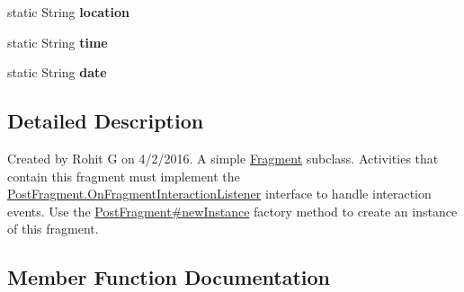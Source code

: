 \begin{DoxyCompactItemize}
\begin{DoxyCompactItemize}
\item 
\hypertarget{classcom_1_1example_1_1sel_1_1lostfound_1_1PostFragment_aa71417aabbbacf85c296b9cbb189a05f}{static \-String {\bfseries location}}\label{classcom_1_1example_1_1sel_1_1lostfound_1_1PostFragment_aa71417aabbbacf85c296b9cbb189a05f}

\item 
\hypertarget{classcom_1_1example_1_1sel_1_1lostfound_1_1PostFragment_a74d19376fb2db9228d8379e1cfcd6722}{static \-String {\bfseries time}}\label{classcom_1_1example_1_1sel_1_1lostfound_1_1PostFragment_a74d19376fb2db9228d8379e1cfcd6722}

\item 
\hypertarget{classcom_1_1example_1_1sel_1_1lostfound_1_1PostFragment_a28ef8cb4afb2d99870de00a4c593a6eb}{static \-String {\bfseries date}}\label{classcom_1_1example_1_1sel_1_1lostfound_1_1PostFragment_a28ef8cb4afb2d99870de00a4c593a6eb}

\end{DoxyCompactItemize}


\subsection{\-Detailed \-Description}
\-Created by \-Rohit \-G on 4/2/2016. \-A simple \hyperlink{}{\-Fragment} subclass. \-Activities that contain this fragment must implement the \hyperlink{interfacecom_1_1example_1_1sel_1_1lostfound_1_1PostFragment_1_1OnFragmentInteractionListener}{\-Post\-Fragment.\-On\-Fragment\-Interaction\-Listener} interface to handle interaction events. \-Use the \hyperlink{classcom_1_1example_1_1sel_1_1lostfound_1_1PostFragment_a7350f5b81aa9144d9acdeca902676773}{\-Post\-Fragment\#new\-Instance} factory method to create an instance of this fragment. 

\subsection{\-Member \-Function \-Documentation}
\hypertarget{classcom_1_1example_1_1sel_1_1lostfound_1_1PostFragment_a7350f5b81aa9144d9acdeca902676773}{
}
\end{DoxyCompactItemize}
